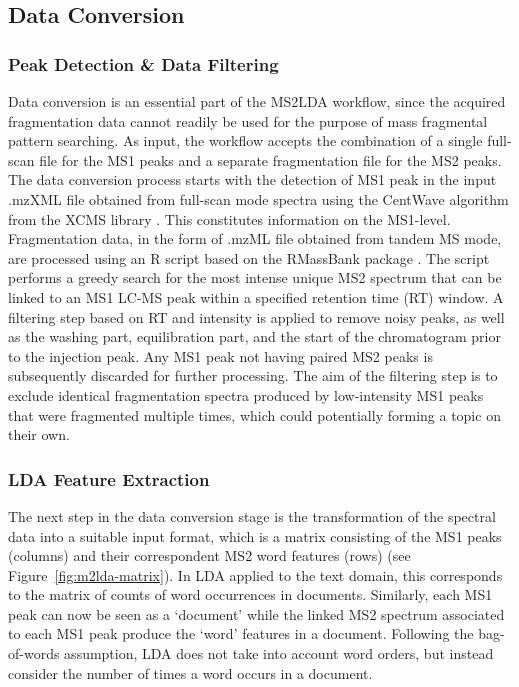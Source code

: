 \subsection{Data Conversion\label{sub:data-conversion}}

\subsubsection{Peak Detection \& Data Filtering}

Data conversion is an essential part of the MS2LDA workflow, since the acquired fragmentation data cannot readily be used for the purpose of mass fragmental pattern searching. As input, the workflow accepts the combination of a single full-scan file for the MS1 peaks and a separate fragmentation file for the MS2 peaks. The data conversion process starts with the detection of MS1 peak in the input .mzXML file obtained from full-scan mode spectra using the CentWave algorithm from the XCMS library \cite{Smith2006}. This constitutes information on the MS1-level. Fragmentation data, in the form of .mzML file obtained from tandem MS mode, are processed using an R script based on the RMassBank package \cite{Stravs2013}. The script performs a greedy search for the most intense unique MS2 spectrum that can be linked to an MS1 LC-MS peak within a specified retention time (RT) window. A filtering step based on RT and intensity is applied to remove noisy peaks, as well as the washing part, equilibration part, and the start of the chromatogram prior to the injection peak. Any MS1 peak not having paired MS2 peaks is subsequently discarded for further processing. The aim of the filtering step is to exclude identical fragmentation spectra produced by low-intensity MS1 peaks that were fragmented multiple times, which could potentially forming a topic on their own. 

\subsubsection{LDA Feature Extraction}

The next step in the data conversion stage is the transformation of the spectral data into a suitable input format, which is a matrix consisting of the MS1 peaks (columns) and their correspondent MS2 word features (rows) (see Figure~\ref{fig:m2lda-matrix}). In LDA applied to the text domain, this corresponds to the matrix of counts of word occurrences in documents. Similarly, each MS1 peak can now be seen as a ‘document’ while the linked MS2 spectrum associated to each MS1 peak produce the ‘word’ features in a document. Following the bag-of-words assumption, LDA does not take into account word orders, but instead consider the number of times a word occurs in a document. 


